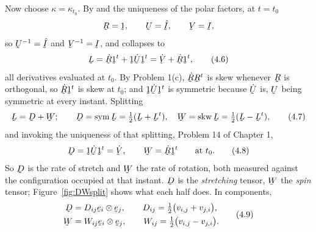 Now choose $\kappa=\kappa_{t_{0}}$. By  and the uniqueness of the
polar factors, at $t=t_{0}$
\[
   \bR=\shift,\qquad \bU=\hI,\qquad \bV=\I ,
\]
so $\bU^{-1}=\hI$ and $\bV^{-1}=\I$, and  collapses to
\begin{equation}
   \bL=\dot\bR\shift^{t}+\shift\dot\bU\shift^{t}=\dot\bV+\dot\bR\shift^{t},
   \tag{4.6}\label{eq:4.6}
\end{equation}
all derivatives evaluated at $t_{0}$. By Problem 1(c), $\dot\bR\bR^{t}$ is
skew whenever $\bR$ is orthogonal, so $\dot\bR\shift^{t}$ is skew at
$t_{0}$; and $\shift\dot\bU\shift^{t}$ is symmetric because $\dot\bU$ is,
$\bU$ being symmetric at every instant. Splitting
\begin{equation}
   \bL=\bD+\bW;\qquad
   \bD=\Sym\bL=\tfrac12(\bL+\bL^{t}),\quad
   \bW=\Skw\bL=\tfrac12(\bL-\bL^{t}),
   \tag{4.7}\label{eq:4.7}
\end{equation}
and invoking the uniqueness of that splitting, Problem 14 of Chapter 1,
\begin{equation}
   \bD=\shift\dot\bU\shift^{t}=\dot\bV,
   \qquad
   \bW=\dot\bR\shift^{t}
   \qquad\text{at }t_{0}.
   \tag{4.8}\label{eq:4.8}
\end{equation}
So $\bD$ is the rate of stretch and $\bW$ the rate of rotation, both
measured against the configuration occupied at that instant. $\bD$ is the
\emph{stretching} tensor, $\bW$ the \emph{spin} tensor;
Figure~\ref{fig:DWsplit} shows what each half does. In components,
\begin{equation}
\begin{aligned}
   \bD&=D_{ij}\be_{i}\otimes\be_{j},\qquad
   D_{ij}=\tfrac12\big(v_{i,j}+v_{j,i}\big),\\
   \bW&=W_{ij}\be_{i}\otimes\be_{j},\qquad
   W_{ij}=\tfrac12\big(v_{i,j}-v_{j,i}\big).
\end{aligned}
   \tag{4.9}\label{eq:4.9}
\end{equation}

